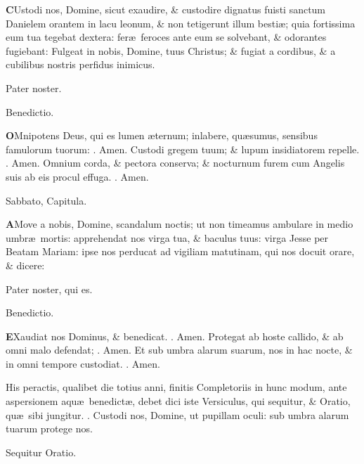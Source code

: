\documentclass[letter,11pt]{book}
\makeatletter
\DeclareRobustCommand{\Vbar}{\vers@resp{-0.1em}{V}}
\DeclareRobustCommand{\Rbar}{\vers@resp{0pt}{R}}
\newcommand{\vers@resp@sym}{\raisebox{0.2ex}{\rotatebox[origin=c]{-20}{$\m@th\rceil$}}}
\newcommand{\vers@resp}[2]{%
  {\ooalign{\hidewidth\kern#1\vers@resp@sym\hidewidth\cr#2\cr}}%
}%
\def\V{\color{Red} \Vbar . \color{black}}
\def\R{\color{Red} \Rbar . \color{black}}
\makeatother
\begin{document}
\begin{multicols*}{2}
\lettrine[lines=2]{\bfseries \color{Red} C}{}Ustodi nos, Domine, sicut exaudire, \& custodire dignatus fuisti sanctum Danielem orantem in lacu leonum, \& non tetigerunt illum besti\ae ; quia fortissima eum tua tegebat dextera: fer\ae \ feroces ante eum se solvebant, \& odorantes fugiebant: Fulgeat in nobis, Domine, tuus Christus; \& fugiat a cordibus, \& a cubilibus nostris perfidus inimicus.
\par Pater noster.
\vspace{-.5em} \begin{center} \color{Red} Benedictio. \end{center} \vspace{-.5em}
\lettrine[lines=2]{\bfseries \color{Red} O}{}Mnipotens Deus, qui es lumen \ae ternum; inlabere, qu\ae sumus, sensibus famulorum tuorum: \R Amen. Custodi gregem tuum; \& lupum insidiatorem repelle. \R Amen. Omnium corda, \& pectora conserva; \& nocturnum furem cum Angelis suis ab eis procul effuga. \R Amen.
\vspace{-.5em} \begin{center} \color{Red} Sabbato, Capitula. \end{center} \vspace{-.5em}
\lettrine[lines=2]{\bfseries \color{Red} A}{}Move a nobis, Domine, scandalum noctis; ut non timeamus ambulare in medio umbr\ae \ mortis: apprehendat nos virga tua, \& baculus tuus: virga Jesse per Beatam Mariam: ipse nos perducat ad vigiliam matutinam, qui nos docuit orare, \& dicere:
\par Pater noster, qui es.
\vspace{-.5em} \begin{center} \color{Red} Benedictio. \end{center} \vspace{-.5em}
\lettrine[lines=2]{\bfseries \color{Red} E}{}Xaudiat nos Dominus, \& benedicat. \R Amen. Protegat ab hoste callido, \& ab omni malo defendat; \R Amen. Et sub umbra alarum suarum, nos in hac nocte, \& in omni tempore custodiat. \R Amen.
\par \color{Red} His peractis, qualibet die totius anni, finitis Completoriis in hunc modum, ante aspersionem aqu\ae \ benedict\ae , debet dici iste Versiculus, qui sequitur, \& Oratio, qu\ae \ sibi jungitur. \color{black}
\newline \V Custodi nos, Domine, ut pupillam oculi: sub umbra alarum tuarum protege nos.
\vspace{-.5em} \begin{center} \color{Red} Sequitur Oratio. \end{center} \vspace{-.5em}

\end{multicols*}
\end{document}
